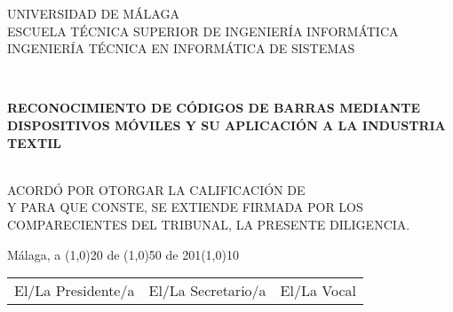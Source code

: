 \pagestyle{empty}

\cleardoublepage

\begin{center}
\uppercase{Universidad de Málaga} \\ [0.5cm]
\uppercase{Escuela Técnica Superior de Ingeniería Informática} \\ [0.5cm]
\uppercase{Ingeniería Técnica en Informática de Sistemas} \\ [1cm]
\end{center}

\begin{footnotesize}
 \\
\begin{center}
{\large \bfseries \uppercase{RECONOCIMIENTO DE CÓDIGOS DE BARRAS MEDIANTE DISPOSITIVOS MÓVILES Y SU APLICACIÓN A LA INDUSTRIA TEXTIL}} \\ [0.5cm]
\end{center}

 \\ [0.5cm]

\noindent\uppercase{Acordó por \hrulefill otorgar la calificación de \hrulefill \\
Y para que conste, se extiende firmada por los comparecientes del tribunal, la presente diligencia.}

\begin{flushright}
{Málaga, a \line(1,0){20} de \line(1,0){50} de 201\line(1,0){10}} \\ [3cm]
\end{flushright}


\begin{tabularx}{\textwidth}{XXX}
El/La Presidente/a & El/La Secretario/a & El/La Vocal
\end{tabularx}

\end{footnotesize}

\blankpage